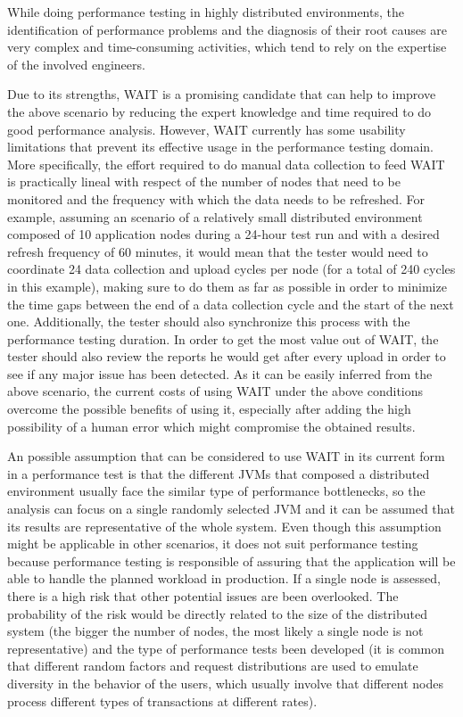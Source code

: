 \documentclass[runningheads,a4paper]{llncs}
\begin{document}
While doing performance testing in highly distributed environments, the
identification of performance problems and the diagnosis of their root causes are very complex and time-consuming
activities, which tend to rely on the expertise of the involved engineers.

Due to its strengths, WAIT is a promising candidate that can help to improve the
above scenario by reducing the expert knowledge and time required to do good
performance analysis. However, WAIT currently has some usability limitations
that prevent its effective usage in the performance testing domain. More
specifically, the effort required to do manual data collection to feed WAIT is
practically lineal with respect of the number of nodes that need to be monitored
and the frequency with which the data needs to be refreshed. For example,
assuming an scenario of a relatively small distributed environment composed
of 10 application nodes during a 24-hour test run and with a desired refresh
frequency of 60 minutes, it would mean that the tester would need to coordinate 
24 data collection and upload cycles per node (for a total of 240
cycles in this example), making sure to do them as far as possible in order to
minimize the time gaps between the end of a data collection cycle and the
start of the next one. Additionally, the tester should also synchronize this
process with the performance testing duration. In order to get the most value
out of WAIT, the tester should also review the reports he would get after every 
upload in order to see if any major issue has been detected. As it can be easily inferred from
the above scenario, the current costs of using WAIT under the above conditions
overcome the possible benefits of using it, especially after adding the high
possibility of a human error which might compromise the obtained results.

An possible assumption that can be considered to use WAIT in its current form
in a performance test is that the different JVMs that composed a
distributed environment usually face the similar type of performance
bottlenecks, so the analysis can focus on a single randomly selected JVM and it
can be assumed that its results are representative of the whole system. Even
though this assumption might be applicable in other scenarios, it does not suit
performance testing because performance testing is responsible of assuring that
the application will be able to handle the planned workload in production. If a
single node is assessed, there is a high risk that other potential issues are
been overlooked. The probability of the risk would be directly related to the
size of the distributed system  (the bigger the number of nodes, the most
likely a single node is not representative) and the type of performance tests
been developed (it is common that different random factors and request
distributions are used to emulate diversity in the behavior of the users,
which usually involve that different nodes process different types of
transactions at different rates).
\end{document}
